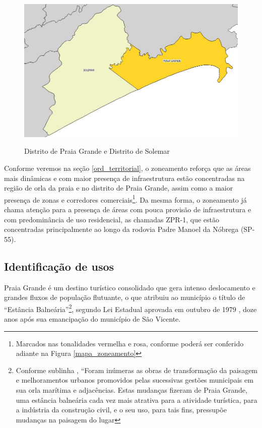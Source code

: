 	\begin{figure}[!htb]
		\centering
		\caption{Distrito de Praia Grande e Distrito de Solemar}
		\includegraphics[width=1\textwidth]{img/Distritos_Praia_Grande.jpg}
		\label{mapa_solemar_pg}
	\end{figure}
	
	Conforme veremos na seção \ref{ord_territorial}, o zoneamento reforça que as áreas mais dinâmicas e com maior presença de infraestrutura estão concentradas na região de orla da praia e no distrito de Praia Grande, assim como a maior presença de zonas e corredores comerciais\footnote{Marcados nas tonalidades vermelha e rosa, conforme poderá ser conferido adiante na Figura \ref{mapa_zoneamento}}. Da mesma forma, o zoneamento já chama atenção para a presença de áreas com pouca provisão de infraestrutura e com predominância de uso residencial, as chamadas ZPR-1, que estão concentradas principalmente ao longo da rodovia Padre Manoel da Nóbrega (SP-55).
			
	\subsection{Identificação de usos}
	
	Praia Grande é um destino turístico consolidado que gera intenso deslocamento e grandes fluxos de população flutuante, o que atribuiu ao município o título de “Estância Balneária”\footnote{Conforme sublinha , ``Foram 	inúmeras as obras de transformação da paisagem e melhoramentos urbanos	promovidos pelas sucessivas gestões municipais em sua orla marítima e adjacências. Estas mudanças fizeram de Praia Grande, uma estância balneária cada vez mais atrativa para a atividade turística, para a indústria da construção	civil, e o seu uso, para tais fins, pressupõe mudanças na paisagem do lugar}, segundo Lei Estadual aprovada em outubro de 1979 \cite{gesp1979a}, doze anos após sua emancipação do município de São Vicente.
	
